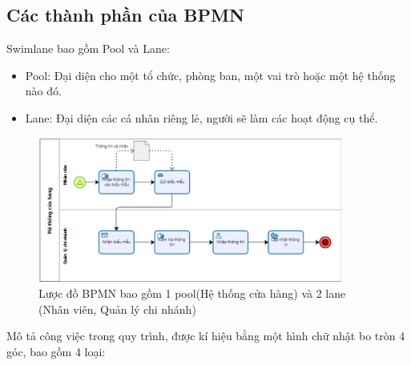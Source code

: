 \subsection{Các thành phần của BPMN}
Swimlane bao gồm Pool và Lane:
\begin{itemize}
    \item Pool: Đại diện cho một tổ chức, phòng ban, một vai trò hoặc một hệ thống nào đó.
    \item Lane: Đại diện các cá nhân riêng lẻ, người sẽ làm các hoạt động cụ thể.
\end{itemize}
\newpage
\begin{figure}[!htp]
    \centering
    \includegraphics[width=10cm]{img/theory/BPMN/BPMN_swimlane.png}
    \newline
    \caption{Lược đồ BPMN bao gồm 1 pool(Hệ thống cửa hàng) và 2 lane (Nhân viên, Quản lý chi nhánh)}
\end{figure}
Mô tả công việc trong quy trình, được kí hiệu bằng một hình chữ nhật bo tròn 4 góc, bao gồm 4 loại:
